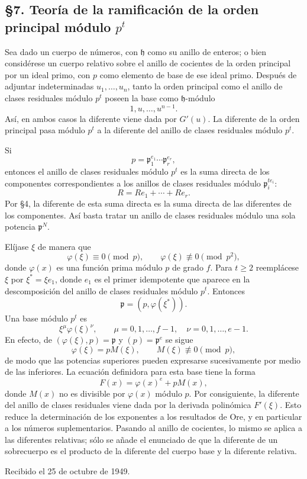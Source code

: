 \documentclass[11pt]{article}
\begin{document}
\subsection*{§7. Teoría de la ramificación de la orden principal módulo $p^t$}

Sea dado un cuerpo de números, con $\mathfrak h$ como su anillo de enteros; o bien considérese un cuerpo relativo sobre el anillo de cocientes de la orden principal por un ideal primo, con $p$ como elemento de base de ese ideal primo. Después de adjuntar indeterminadas $u_1,\ldots,u_n$, tanto la orden principal como el anillo de clases residuales módulo $p^t$ poseen la base como $\mathfrak h$-módulo
\[
        1,u,\ldots,u^{n-1}.
\]
Así, en ambos casos la diferente viene dada por $G'(u)$. La diferente de la orden principal pasa módulo $p^t$ a la diferente del anillo de clases residuales módulo $p^t$.

Si
\[
        p=\mathfrak p_1^{e_1}\cdots\mathfrak p_r^{e_r},
\]
entonces el anillo de clases residuales módulo $p^t$ es la suma directa de los componentes correspondientes a los anillos de clases residuales módulo $\mathfrak p_i^{te_i}$:
\[
        R=Re_1+\cdots+Re_r.
\]
Por §4, la diferente de esta suma directa es la suma directa de las diferentes de los componentes. Así basta tratar un anillo de clases residuales módulo una sola potencia $\mathfrak p^N$.

Elíjase $\xi$ de manera que
\[
        \varphi(\xi)\equiv0\pmod p,
        \qquad
        \varphi(\xi)\not\equiv0\pmod {p^2},
\]
donde $\varphi(x)$ es una función prima módulo $p$ de grado $f$. Para $t\ge2$ reemplácese $\xi$ por $\xi^*=\xi e_1$, donde $e_1$ es el primer idempotente que aparece en la descomposición del anillo de clases residuales módulo $p^t$. Entonces
\[
        \mathfrak p=(p,\varphi(\xi^*)).
\]
Una base módulo $p^t$ es
\[
        \xi^{\mu}\varphi(\xi)^{\nu},
        \qquad
        \mu=0,1,\ldots,f-1,
        \quad
        \nu=0,1,\ldots,e-1.
\]
En efecto, de $(\varphi(\xi),p)=\mathfrak p$ y $(p)=\mathfrak p^e$ se sigue
\[
        \varphi(\xi)=pM(\xi),
        \qquad M(\xi)\not\equiv0\pmod p,
\]
de modo que las potencias superiores pueden expresarse sucesivamente por medio de las inferiores. La ecuación definidora para esta base tiene la forma
\[
        F(x)=\varphi(x)^e+pM(x),
\]
donde $M(x)$ no es divisible por $\varphi(x)$ módulo $p$. Por consiguiente, la diferente del anillo de clases residuales viene dada por la derivada polinómica $F'(\xi)$. Esto reduce la determinación de los exponentes a los resultados de Ore, y en particular a los números suplementarios. Pasando al anillo de cocientes, lo mismo se aplica a las diferentes relativas; sólo se añade el enunciado de que la diferente de un sobrecuerpo es el producto de la diferente del cuerpo base y la diferente relativa.

\begin{center}
Recibido el 25 de octubre de 1949.
\end{center}
\end{document}
